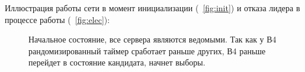 \documentclass[subf, href, colorlinks=true, 14pt,
times, mtpro, specialist]{disser}
\newcommand{\figref}[1]{\figurename~\ref{#1}}
\theoremstyle{definition}
\begin{document}
Иллюстрация работы сети в момент инициализации (\figref{fig:init}) и отказа лидера в процессе работы (\figref{fig:elec}):


\begin{figure}[H]
\begin{minipage}[h]{0.46\linewidth}
\begin{small}
Начальное состояние, все сервера являются ведомыми. Так как у В4 рандомизированный таймер сработает раньше других, В4 раньше перейдет в состояние кандидата, начнет выборы. \\
\end{small}
\end{minipage}
\hfill
\begin{minipage}[h]{0.46\linewidth}
\vspace{-0.2cm}

\end{minipage}
\end{figure}
\end{document}
